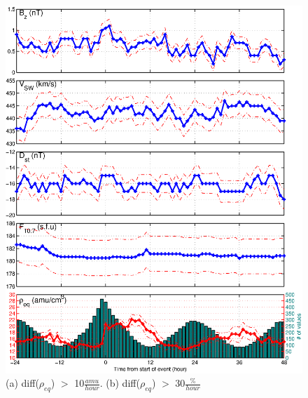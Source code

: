 \documentclass[10pt,twocolumn]{article}
\begin{document}
\begin{figure}[htp!]
\includegraphics[scale=0.45]{paperfigures/stormavs-diffden-30percent.eps}
\caption{(a) diff($\rho_{eq}$) $>$ 10$\frac{amu}{hour}$. (b) diff($\rho_{eq}$) $>$ 30$\frac{\%}{hour}$}
\label{rhochange}
\end{figure}
\clearpage
\end{document}
